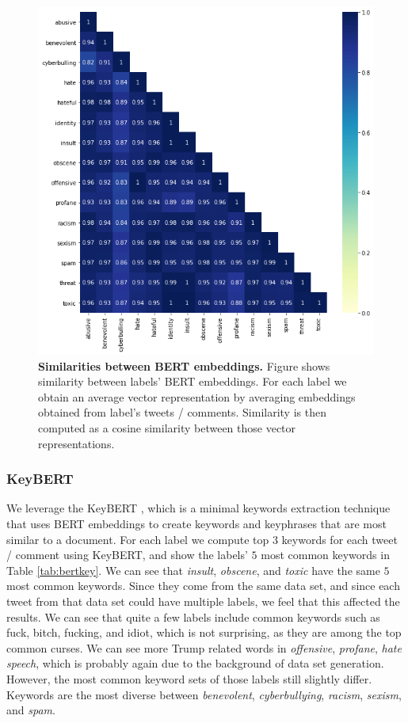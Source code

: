\documentclass[fleqn,moreauthors,10pt]{ds_report}
\begin{document}
\begin{figure}[htb]\centering
	\includegraphics[width=0.9\linewidth]{bert_sim1.png}
	\caption{\textbf{Similarities between BERT embeddings.} Figure shows similarity between labels' BERT embeddings. For each label we obtain an average vector representation by averaging embeddings obtained from label's tweets / comments. Similarity is  then computed as a cosine similarity between those vector representations.}
	\label{fig:bertsim1}
\end{figure}

\subsubsection{KeyBERT}
We leverage the KeyBERT \cite{grootendorst2020keybert}, which is a minimal keywords extraction technique that uses BERT embeddings to create keywords and keyphrases that are most similar to a document. For each label we compute top $3$ keywords for each tweet / comment using KeyBERT, and show the labels' $5$ most common keywords in Table \ref{tab:bertkey}. We can see that \textit{insult}, \textit{obscene}, and \textit{toxic} have the same $5$ most common keywords. Since they come from the same data set, and since each tweet from that data set could have multiple labels, we feel that this affected the results. We can see that quite a few labels include common keywords such as fuck, bitch, fucking, and idiot, which is not surprising, as they are among the top common curses. We can see more Trump related words in \textit{offensive}, \textit{profane}, \textit{hate speech}, which is probably again due to the background of data set generation. However, the most common keyword sets of those labels still slightly differ. Keywords are the most diverse between \textit{benevolent}, \textit{cyberbullying}, \textit{racism}, \textit{sexism}, and \textit{spam}.
\end{document}
